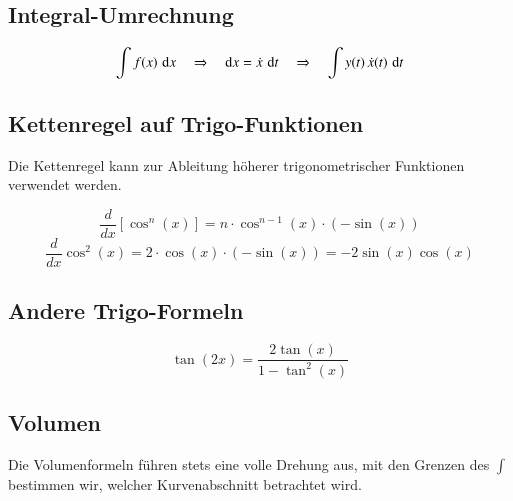 \hfill\vline\hfill
\begin{minipage}[t]{0.49\columnwidth}
    \subsection{Integral-Umrechnung}	

    \vspace{-0.2cm}

    \[ \int f(x) \, \mathop{} \! \mathrm{d} x \quad \Rightarrow \quad  \mathop{} \! \mathrm{d} x = \dot{x} \, \mathop{} \! \mathrm{d} t \quad \Rightarrow \quad \int y(t) \, \dot{x}(t) \, \mathop{} \! \mathrm{d} t \]
    
    \subsection{Kettenregel auf Trigo-Funktionen} 
    Die Kettenregel kann zur Ableitung höherer trigonometrischer Funktionen verwendet werden.
    
    \example{}\vspace{-1em}
    
    \[\frac{d}{dx} [\cos^n(x)] = n \cdot \cos^{n-1}(x) \cdot (-\sin(x))\]
    \vspace{-1em}
    \[\frac{d}{dx} \cos^2(x) = 2 \cdot \cos(x) \cdot (-\sin(x)) = -2\sin(x)\cos(x)\]

    \subsection{Andere Trigo-Formeln}
    \[\tan(2x) = \frac{2\tan(x)}{1-\tan^2(x)}\]

    \subsection{Volumen}
    Die Volumenformeln führen stets eine volle Drehung aus, mit den Grenzen des $\int$
    bestimmen wir, welcher Kurvenabschnitt betrachtet wird.
\end{minipage}